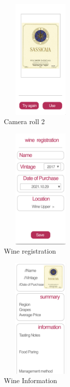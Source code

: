 \documentclass[sigconf, nonacm]{acmart}
\begin{document}
\begin{figure}
  \centering
  \includegraphics[width=4cm, height=6cm]{photo.png}
  \caption{Camera roll 2}
  \label{fig:My Winecellar}
\end{figure}

\begin{figure}
  \centering
  \includegraphics[width=4cm, height=6cm]{regiinfo.png}
  \caption{Wine registration}
  \label{fig:My Winecellar}
\end{figure}

\clearpage

\begin{figure}
  \centering
  \includegraphics[width=4cm, height=6cm]{wineinfo.png}
  \caption{Wine Information}
  \label{fig:My Winecellar}
\end{figure}
\end{document}
